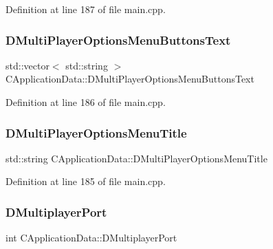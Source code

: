 Definition at line 187 of file main.\+cpp.

\hypertarget{classCApplicationData_a400aa1df18482fe5d9f34e861a0dc257}{}\label{classCApplicationData_a400aa1df18482fe5d9f34e861a0dc257} 
\subsubsection{\texorpdfstring{D\+Multi\+Player\+Options\+Menu\+Buttons\+Text}{DMultiPlayerOptionsMenuButtonsText}}
{\footnotesize\ttfamily std\+::vector$<$ std\+::string $>$ C\+Application\+Data\+::\+D\+Multi\+Player\+Options\+Menu\+Buttons\+Text\hspace{0.3cm}{\ttfamily [protected]}}



Definition at line 186 of file main.\+cpp.

\hypertarget{classCApplicationData_aa9c4883274c2313743a42b68c7fc427f}{}\label{classCApplicationData_aa9c4883274c2313743a42b68c7fc427f} 
\subsubsection{\texorpdfstring{D\+Multi\+Player\+Options\+Menu\+Title}{DMultiPlayerOptionsMenuTitle}}
{\footnotesize\ttfamily std\+::string C\+Application\+Data\+::\+D\+Multi\+Player\+Options\+Menu\+Title\hspace{0.3cm}{\ttfamily [protected]}}



Definition at line 185 of file main.\+cpp.

\hypertarget{classCApplicationData_a99bed2c18513304de1cf2a2344bf091f}{}\label{classCApplicationData_a99bed2c18513304de1cf2a2344bf091f} 
\subsubsection{\texorpdfstring{D\+Multiplayer\+Port}{DMultiplayerPort}}
{\footnotesize\ttfamily int C\+Application\+Data\+::\+D\+Multiplayer\+Port\hspace{0.3cm}{\ttfamily [protected]}}



